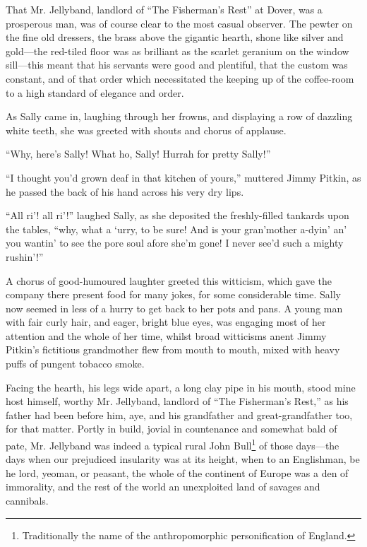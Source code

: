 \documentclass[paper=a5,BCOR=7mm,twoside,DIV=calc,12pt,usegeometry,chapterprefix,endperiod,headings=big]{scrbook}
\begin{document}
That Mr. Jellyband, landlord of \enquote{The Fisherman's Rest} at Dover, was a prosperous man, was of course clear to the most casual observer. The pewter on the fine old dressers, the brass above the gigantic hearth, shone like silver and gold---the red-tiled floor was as brilliant as the scarlet geranium on the window sill---this meant that his servants were good and plentiful, that the custom was constant, and of that order which necessitated the keeping up of the coffee-room to a high standard of elegance and order.

As Sally came in, laughing through her frowns, and displaying a row of dazzling white teeth, she was greeted with shouts and chorus of applause.

\enquote{Why, here's Sally! What ho, Sally! Hurrah for pretty Sally!}

\enquote{I thought you'd grown deaf in that kitchen of yours,} muttered Jimmy Pitkin, as he passed the back of his hand across his very dry lips.

\enquote{All ri’! all ri’!} laughed Sally, as she deposited the freshly-filled tankards upon the tables, \enquote{why, what a `urry, to be sure! And is your gran'mother a-dyin’ an’ you wantin’ to see the pore soul afore she'm gone! I never see'd such a mighty rushin’!}

A chorus of good-humoured laughter greeted this witticism, which gave the company there present food for many jokes, for some considerable time. Sally now seemed in less of a hurry to get back to her pots and pans. A young man with fair curly hair, and eager, bright blue eyes, was engaging most of her attention and the whole of her time, whilst broad witticisms anent Jimmy Pitkin's fictitious grandmother flew from mouth to mouth, mixed with heavy puffs of pungent tobacco smoke.

Facing the hearth, his legs wide apart, a long clay pipe in his mouth, stood mine host himself, worthy Mr. Jellyband, landlord of \enquote{The Fisherman's Rest,} as his father had been before him, aye, and his grandfather and great-grandfather too, for that matter. Portly in build, jovial in countenance and somewhat bald of pate, Mr. Jellyband was indeed a typical rural John Bull\footnote{Traditionally the name of the anthropomorphic personification of England.} of those days---the days when our prejudiced insularity was at its height, when to an Englishman, be he lord, yeoman, or peasant, the whole of the continent of Europe was a den of immorality, and the rest of the world an unexploited land of savages and cannibals.
\end{document}
